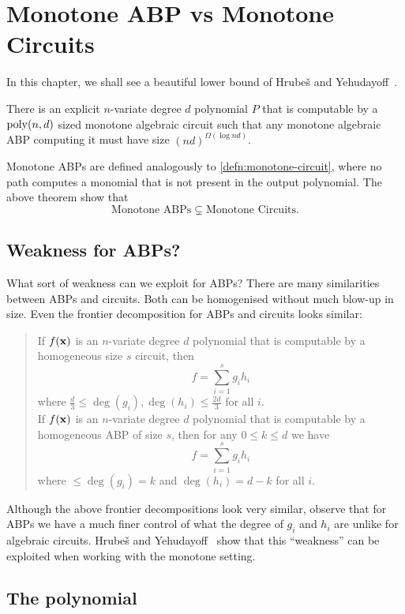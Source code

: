 \section{Monotone ABP vs Monotone Circuits}
In this chapter, we shall see a beautiful lower bound of Hrube\v{s} and Yehudayoff~\cite{HY16}.

\begin{theorem}\label{thm:mon-abp-ckt-sep}
  There is an explicit $n$-variate degree $d$ polynomial $P$ that is computable by a $\operatorname{poly}(n,d)$ sized monotone algebraic circuit such that any monotone algebraic ABP computing it must have size $(nd)^{\Omega(\log nd)}$.
\end{theorem}

Monotone ABPs are defined analogously to \autoref{defn:monotone-circuit}, where no path computes a monomial that is not present in the output polynomial. The above theorem show that
  \[
    \text{Monotone ABPs} \subsetneq \text{Monotone Circuits}.
  \]

\subsection*{Weakness for ABPs?}

What sort of weakness can we exploit for ABPs? There are many similarities between ABPs and circuits. Both can be homogenised without much blow-up in size. Even the frontier decomposition for ABPs and circuits looks similar:
\begin{quote}
  If $f(\mathbf{x})$ is an $n$-variate degree $d$ polynomial that is computable by a homogeneous size $s$ circuit, then
  \[
    f = \sum_{i=1}^s g_i h_i
  \]
  where $\frac{d}{3} \leq \deg(g_i),\deg(h_i) \leq \frac{2d}{3}$ for all $i$.\\

  If $f(\mathbf{x})$ is an $n$-variate degree $d$ polynomial that is computable by a homogeneous ABP of size $s$, then for any $0\leq k \leq d$ we have
  \[
    f = \sum_{i=1}^s g_i h_i
  \]
  where $\leq \deg(g_i) = k$ and $\deg(h_i) =  d-k$ for all $i$.
\end{quote}

Although the above frontier decompositions look very similar, observe that for ABPs we have a much finer control of what the degree of $g_i$ and $h_i$ are unlike for algebraic circuits. Hrube\v{s} and Yehudayoff~\cite{HY16} show that this ``weakness'' can be exploited when working with the monotone setting.

\subsection{The polynomial}

